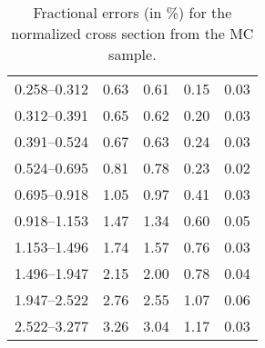 \begin{table}
\begin{center}
\begin{tabular}{@{}l l l l l@{}}
            0.258--0.312 & 0.63 & 0.61 & 0.15 & 0.03  \\
            0.312--0.391 & 0.65 & 0.62 & 0.20 & 0.03  \\
            0.391--0.524 & 0.67 & 0.63 & 0.24 & 0.03  \\
            0.524--0.695 & 0.81 & 0.78 & 0.23 & 0.02  \\
            0.695--0.918 & 1.05 & 0.97 & 0.41 & 0.03  \\
            0.918--1.153 & 1.47 & 1.34 & 0.60 & 0.05  \\
            1.153--1.496 & 1.74 & 1.57 & 0.76 & 0.03  \\
            1.496--1.947 & 2.15 & 2.00 & 0.78 & 0.04  \\
            1.947--2.522 & 2.76 & 2.55 & 1.07 & 0.06  \\
            2.522--3.277 & 3.26 & 3.04 & 1.17 & 0.03  \\
            \bottomrule
        \end{tabular}
    \end{center}
    \caption[
        Fractional errors for the normalized cross section from the
        \POWHEG MC sample.
    ]{
        Fractional errors (in \%) for the normalized cross section from the
        \POWHEG MC sample.
    }
    \label{tab:powheg_uncert_norm}
\end{table}
